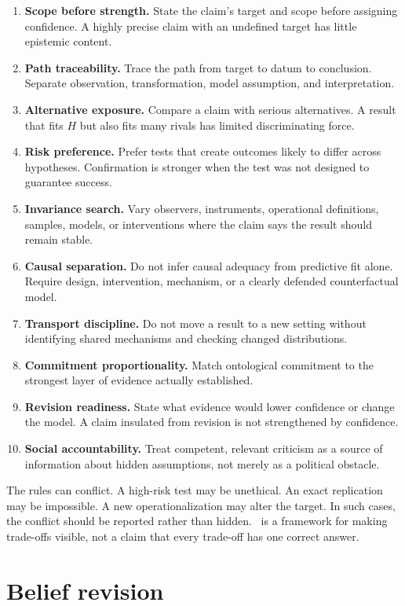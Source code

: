 \begin{enumerate}[label=\textbf{R\arabic*.}]
\item \textbf{Scope before strength.} State the claim's target and scope before
assigning confidence. A highly precise claim with an undefined target has
little epistemic content.
\item \textbf{Path traceability.} Trace the path from target to datum to
conclusion. Separate observation, transformation, model assumption, and
interpretation.
\item \textbf{Alternative exposure.} Compare a claim with serious alternatives.
A result that fits \(H\) but also fits many rivals has limited discriminating
force.
\item \textbf{Risk preference.} Prefer tests that create outcomes likely to
differ across hypotheses. Confirmation is stronger when the test was not
designed to guarantee success.
\item \textbf{Invariance search.} Vary observers, instruments, operational
definitions, samples, models, or interventions where the claim says the
result should remain stable.
\item \textbf{Causal separation.} Do not infer causal adequacy from predictive
fit alone. Require design, intervention, mechanism, or a clearly defended
counterfactual model.
\item \textbf{Transport discipline.} Do not move a result to a new setting
without identifying shared mechanisms and checking changed distributions.
\item \textbf{Commitment proportionality.} Match ontological commitment to the
strongest layer of evidence actually established.
\item \textbf{Revision readiness.} State what evidence would lower confidence or
change the model. A claim insulated from revision is not strengthened by
confidence.
\item \textbf{Social accountability.} Treat competent, relevant criticism as a
source of information about hidden assumptions, not merely as a political
obstacle.
\end{enumerate}

The rules can conflict. A high-risk test may be unethical. An exact replication
may be impossible. A new operationalization may alter the target. In such
cases, the conflict should be reported rather than hidden. \RCR\ is a framework
for making trade-offs visible, not a claim that every trade-off has one
correct answer.

\section{Belief revision}


